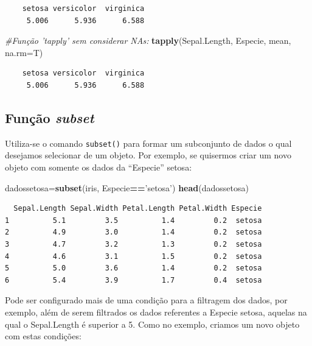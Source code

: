 \documentclass[12pt,brazil,oneside]{book}
\newenvironment{Shaded}{\begin{snugshade}}{\end{snugshade}}
\newcommand{\CommentTok}[1]{\textcolor[rgb]{0.56,0.35,0.01}{\textit{#1}}}
\newcommand{\DataTypeTok}[1]{\textcolor[rgb]{0.13,0.29,0.53}{#1}}
\newcommand{\KeywordTok}[1]{\textcolor[rgb]{0.13,0.29,0.53}{\textbf{#1}}}
\newcommand{\NormalTok}[1]{#1}
\newcommand{\OperatorTok}[1]{\textcolor[rgb]{0.81,0.36,0.00}{\textbf{#1}}}
\newcommand{\StringTok}[1]{\textcolor[rgb]{0.31,0.60,0.02}{#1}}
\begin{document}
\begin{verbatim}
    setosa versicolor  virginica 
     5.006      5.936      6.588 
\end{verbatim}

\begin{Shaded}
\begin{Highlighting}[]
\CommentTok{#Função 'tapply' sem considerar NAs:}
\KeywordTok{tapply}\NormalTok{(Sepal.Length, Especie, mean, }\DataTypeTok{na.rm=}\NormalTok{T)}
\end{Highlighting}
\end{Shaded}

\begin{verbatim}
    setosa versicolor  virginica 
     5.006      5.936      6.588 
\end{verbatim}

\hypertarget{funcao-subset}{%
\subsection{\texorpdfstring{Função \emph{subset}}{Função subset}}\label{funcao-subset}}

Utiliza-se o comando \texttt{subset()} para formar um subconjunto de dados o qual desejamos selecionar de um objeto. Por exemplo, se quisermos criar um novo objeto com somente os dados da ``Especie'' setosa:

\begin{Shaded}
\begin{Highlighting}[]
\NormalTok{dadossetosa=}\KeywordTok{subset}\NormalTok{(iris, Especie}\OperatorTok{==}\StringTok{'setosa'}\NormalTok{)}
\KeywordTok{head}\NormalTok{(dadossetosa)}
\end{Highlighting}
\end{Shaded}

\begin{verbatim}
  Sepal.Length Sepal.Width Petal.Length Petal.Width Especie
1          5.1         3.5          1.4         0.2  setosa
2          4.9         3.0          1.4         0.2  setosa
3          4.7         3.2          1.3         0.2  setosa
4          4.6         3.1          1.5         0.2  setosa
5          5.0         3.6          1.4         0.2  setosa
6          5.4         3.9          1.7         0.4  setosa
\end{verbatim}

Pode ser configurado mais de uma condição para a filtragem dos dados, por exemplo, além de serem filtrados os dados referentes a Especie setosa, aquelas na qual o Sepal.Length é superior a 5. Como no exemplo, criamos um novo objeto com estas condições:
\end{document}
